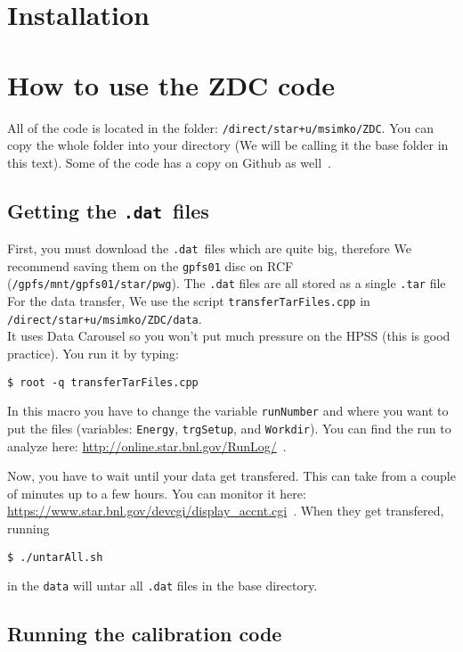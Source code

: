 \section{Installation}
\section{How to use the ZDC code}\hypertarget{how-to-use-the-zdc-code}{}\label{how-to-use-the-zdc-code}

All of the code is located in the folder: \texttt{/direct/star+u/msimko/ZDC}. You can copy the whole folder into
your directory (We will be calling it the base folder in this text). Some of the code has
a copy on Github as well~\cite{ZdcGithubRepo}.

\subsection{Getting the \texttt{.dat}\ files}\hypertarget{getting-the-dat-files}{}\label{getting-the-dat-files}

First, you must download the \verb=.dat=\ files which are quite big, therefore We recommend saving them on
the \texttt{gpfs01} disc on RCF (\texttt{/gpfs/mnt/gpfs01/star/pwg}). The \texttt{.dat} files are all stored as a single \texttt{.tar} file For the data transfer, We use the script
\texttt{transferTarFiles.cpp} in\\
\texttt{/direct/star+u/msimko/ZDC/data}.\\
It uses Data Carousel so you won't put much
pressure on the HPSS (this is good practice). You run it by typing:
\begin{verbatim}
$ root -q transferTarFiles.cpp
\end{verbatim}
In this macro you have to change the variable
\texttt{runNumber} and where you want to put the files (variables: \texttt{Energy}, \texttt{trgSetup}, 
and \texttt{Workdir}). You can find the run to analyze here:
\url{http://online.star.bnl.gov/RunLog/}~\cite{runLogBrowser}.

Now, you have to wait until your data get transfered. This can take from a couple of minutes up to a few hours.
You can monitor it here:
\url{https://www.star.bnl.gov/devcgi/display_accnt.cgi}~\cite{hpss}.
When they get transfered, running
\begin{verbatim}
$ ./untarAll.sh
\end{verbatim}
in the \texttt{data} will untar all \texttt{.dat} files in the base directory.

\subsection{Running the calibration code}\hypertarget{making-the-ttree}{}\label{making-the-ttree}

